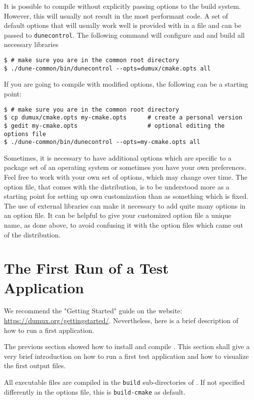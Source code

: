 It is possible to compile \Dumux without explicitly passing options to the build system.
However, this will usually not result in the most performant code. A set of default options
that will usually work well is provided with \Dumux in a file and can be passed
to \texttt{dunecontrol}. The following command will configure \Dune and \Dumux
and build all necessary libraries
\begin{lstlisting}[style=Bash]
$ # make sure you are in the common root directory
$ ./dune-common/bin/dunecontrol --opts=dumux/cmake.opts all
\end{lstlisting}

If you are going to compile with modified options, the following
can be a starting point:
\begin{lstlisting}[style=Bash]
$ # make sure you are in the common root directory
$ cp dumux/cmake.opts my-cmake.opts      # create a personal version
$ gedit my-cmake.opts                    # optional editing the options file
$ ./dune-common/bin/dunecontrol --opts=my-cmake.opts all
\end{lstlisting}

Sometimes, it is necessary to have additional options which
are specific to a package set of an operating system or
sometimes you have your own preferences.
Feel free to work with your own set of options, which may change over time.
The option file, that comes with the distribution, is to be understood more as a starting point
for setting up own customization than as something which is fixed.
The use of external libraries can make it necessary to add quite many options in an option file.
It can be helpful to give your customized option file a unique name, as done above,
to avoid confusing it with the option files which came out of the distribution.

\section{The First Run of a Test Application}
\label{quick-start-guide}

We recommend the "Getting Started" guide on the \Dumux website: \url{https://dumux.org/gettingstarted/}.
Nevertheless, here is a brief description of how to run a first application.

The previous section showed how to install and compile \Dumux. This section
shall give a very brief introduction on how to run a first test application and how
to visualize the first output files.\par
All executable files are compiled in the \texttt{build} sub-directories of \Dumux.
If not specified differently in the options file, this is \texttt{build-cmake} as default.

